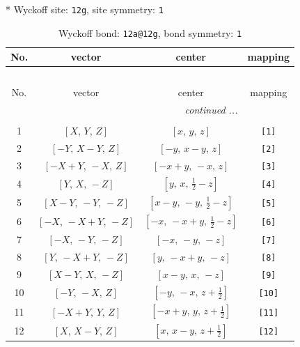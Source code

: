 \documentclass[fleqn,8pt]{jsarticle}
\begin{document}
* Wyckoff site: {\tt 12g}, site symmetry: {\tt 1}
\renewcommand{\arraystretch}{1.2}
\begin{longtable}{cccc}
\caption{Wyckoff bond: {\tt 12a@12g}, bond symmetry: {\tt 1}}
 \\
 \hline \hline
No. & vector & center & mapping \\ \hline \endfirsthead

\multicolumn{3}{l}{\tablename\ \thetable{}} \\
 \hline \hline
No. & vector & center & mapping \\ \hline \endhead

 \hline \hline
\multicolumn{3}{r}{\footnotesize\it continued ...} \\ \endfoot

 \hline \hline
\multicolumn{3}{r}{} \\ \endlastfoot

1 & $\left[ X,\, Y,\, Z \right]$ & $\left[ x,\, y,\, z \right]$ & {\tt [1]} \\ \hline
2 & $\left[ - Y,\, X - Y,\, Z \right]$ & $\left[ - y,\, x - y,\, z \right]$ & {\tt [2]} \\ \hline
3 & $\left[ - X + Y,\, - X,\, Z \right]$ & $\left[ - x + y,\, - x,\, z \right]$ & {\tt [3]} \\ \hline
4 & $\left[ Y,\, X,\, - Z \right]$ & $\left[ y,\, x,\, \frac{1}{2} - z \right]$ & {\tt [4]} \\ \hline
5 & $\left[ X - Y,\, - Y,\, - Z \right]$ & $\left[ x - y,\, - y,\, \frac{1}{2} - z \right]$ & {\tt [5]} \\ \hline
6 & $\left[ - X,\, - X + Y,\, - Z \right]$ & $\left[ - x,\, - x + y,\, \frac{1}{2} - z \right]$ & {\tt [6]} \\ \hline
7 & $\left[ - X,\, - Y,\, - Z \right]$ & $\left[ - x,\, - y,\, - z \right]$ & {\tt [7]} \\ \hline
8 & $\left[ Y,\, - X + Y,\, - Z \right]$ & $\left[ y,\, - x + y,\, - z \right]$ & {\tt [8]} \\ \hline
9 & $\left[ X - Y,\, X,\, - Z \right]$ & $\left[ x - y,\, x,\, - z \right]$ & {\tt [9]} \\ \hline
10 & $\left[ - Y,\, - X,\, Z \right]$ & $\left[ - y,\, - x,\, z + \frac{1}{2} \right]$ & {\tt [10]} \\ \hline
11 & $\left[ - X + Y,\, Y,\, Z \right]$ & $\left[ - x + y,\, y,\, z + \frac{1}{2} \right]$ & {\tt [11]} \\ \hline
12 & $\left[ X,\, X - Y,\, Z \right]$ & $\left[ x,\, x - y,\, z + \frac{1}{2} \right]$ & {\tt [12]} \\
\end{longtable}
\end{document}
